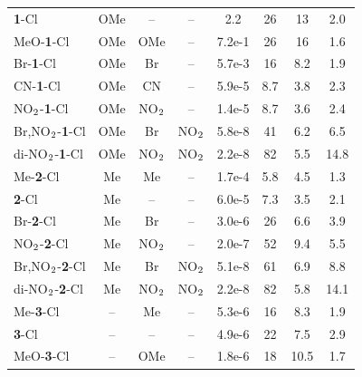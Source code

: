 \documentclass{tufte-handout}
\begin{document}
\begin{table}[h!]
\begin{tabular}{l c c c S S S S}
\midrule
\textbf{1}-Cl                  &  OMe          &   --            &  --           &      2.2       &   26    &   13    &   2.0 \\
MeO-\textbf{1}-Cl              &  OMe          &  OMe            &  --           &      7.2e-1    &   26    &   16    &   1.6 \\
Br-\textbf{1}-Cl               &  OMe          &  Br             &  --           &      5.7e-3    &   16    &   8.2   &   1.9 \\
CN-\textbf{1}-Cl               &  OMe          &  CN             &  --           &      5.9e-5    &   8.7   &   3.8   &   2.3 \\
NO$\rm _2$-\textbf{1}-Cl       &  OMe          &  NO$\rm _2$     &  --           &      1.4e-5    &   8.7   &   3.6   &   2.4 \\
Br,NO$\rm _2$-\textbf{1}-Cl    &  OMe          &  Br             &  NO$\rm _2$   &      5.8e-8    &   41    &   6.2   &   6.5 \\
di-NO$\rm _2$-\textbf{1}-Cl    &  OMe          &  NO$\rm _2$     &  NO$\rm _2$   &      2.2e-8    &   82    &   5.5   &   14.8 \\
\noalign{\medskip}
Me-\textbf{2}-Cl               &  Me           &  Me             &  --           &      1.7e-4    &   5.8   &   4.5   &   1.3 \\
\textbf{2}-Cl                  &  Me           &   --            &  --           &      6.0e-5    &   7.3   &   3.5   &   2.1 \\
Br-\textbf{2}-Cl               &  Me           &  Br             &  --           &      3.0e-6    &   26    &   6.6   &   3.9 \\
NO$\rm _2$-\textbf{2}-Cl       &  Me           &  NO$\rm _2$     &  --           &      2.0e-7    &   52    &   9.4   &   5.5 \\
Br,NO$\rm _2$-\textbf{2}-Cl    &  Me           &  Br             &  NO$\rm _2$   &      5.1e-8    &   61    &   6.9   &   8.8 \\
di-NO$\rm _2$-\textbf{2}-Cl    &  Me           &  NO$\rm _2$     &  NO$\rm _2$   &      2.2e-8    &   82    &   5.8   &   14.1 \\
\noalign{\medskip}        
Me-\textbf{3}-Cl               &  --           &  Me             &  --           &      5.3e-6    &   16    &   8.3   &   1.9 \\
\textbf{3}-Cl                  &  --           &   --            &  --           &      4.9e-6    &   22    &   7.5   &   2.9 \\
MeO-\textbf{3}-Cl              &  --           &  OMe            &  --           &      1.8e-6    &   18    &   10.5  &   1.7 \\

\end{tabular}
\end{table}
\end{document}
